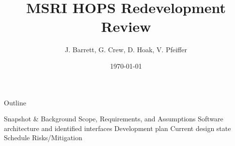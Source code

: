 \documentclass[8pt]{beamer}
\title{MSRI HOPS Redevelopment Review}
\author[Haystack]{J. Barrett, G. Crew, D. Hoak, V. Pfeiffer}
\institute[MIT]{\large MIT Haystack Observatory}
\date{\today}
\begin{document}
\renewcommand{\outlinei}{enumerate}
\renewcommand{\outlineii}{enumerate}
\renewcommand{\outlineiii}{itemize}


\begin{frame}
\titlepage
\end{frame}





\begin{frame}{Outline}
    \begin{outline}
        \1 Snapshot \& Background
        \1 Scope, Requirements, and Assumptions
        \1 Software architecture and identified interfaces
        \1 Development plan
        \1 Current design state
        \1 Schedule
        \1 Risks/Mitigation
    \end{outline}
\end{frame}


\end{document}
